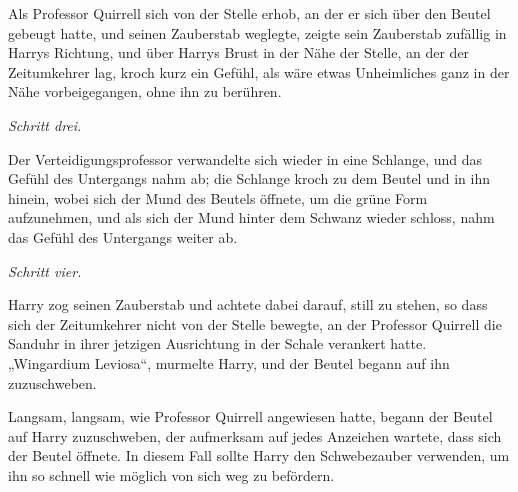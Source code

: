 Als Professor Quirrell sich von der Stelle erhob, an der er sich über den Beutel gebeugt hatte, und seinen Zauberstab weglegte, zeigte sein Zauberstab zufällig in Harrys Richtung, und über Harrys Brust in der Nähe der Stelle, an der der Zeitumkehrer lag, kroch kurz ein Gefühl, als wäre etwas Unheimliches ganz in der Nähe vorbeigegangen, ohne ihn zu berühren.

\emph{Schritt drei.}

Der Verteidigungsprofessor verwandelte sich wieder in eine Schlange, und das Gefühl des Untergangs nahm ab; die Schlange kroch zu dem Beutel und in ihn hinein, wobei sich der Mund des Beutels öffnete, um die grüne Form aufzunehmen, und als sich der Mund hinter dem Schwanz wieder schloss, nahm das Gefühl des Untergangs weiter ab.

\emph{Schritt vier.}

Harry zog seinen Zauberstab und achtete dabei darauf, still zu stehen, so dass sich der Zeitumkehrer nicht von der Stelle bewegte, an der Professor Quirrell die Sanduhr in ihrer jetzigen Ausrichtung in der Schale verankert hatte. „Wingardium Leviosa“, murmelte Harry, und der Beutel begann auf ihn zuzuschweben.

Langsam, langsam, wie Professor Quirrell angewiesen hatte, begann der Beutel auf Harry zuzuschweben, der aufmerksam auf jedes Anzeichen wartete, dass sich der Beutel öffnete. In diesem Fall sollte Harry den Schwebezauber verwenden, um ihn so schnell wie möglich von sich weg zu befördern.

